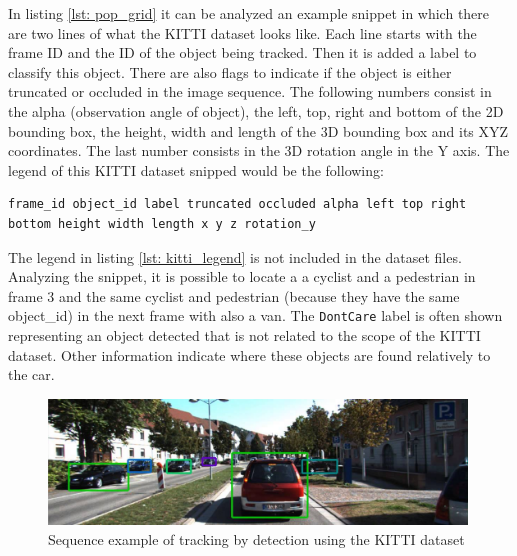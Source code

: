 In listing \ref{lst: pop_grid} it can be analyzed an example snippet in which there are two lines of what the KITTI dataset looks like. Each line starts with the frame ID and the ID of the object being tracked. Then it is added a label to classify this object. There are also flags to indicate if the object is either truncated or occluded in the image sequence. The following numbers consist in the alpha (observation angle of object), the left, top, right and bottom of the 2D bounding box, the height, width and length of the 3D bounding box and its XYZ coordinates. The last number consists in the 3D rotation angle in the Y axis. \cite{Team} The legend of this KITTI dataset snipped would be the following:

\begin{center}
	\begin{lstlisting}[caption={KITTI dataset file snippet legend.}, label={lst: kitti_legend}]
	frame_id object_id label truncated occluded alpha left top right bottom height width length x y z rotation_y	\end{lstlisting}
\end{center}

The legend in listing \ref{lst: kitti_legend} is not included in the dataset files. Analyzing the snippet, it is possible to locate a a cyclist and a pedestrian in frame 3 and the same cyclist and pedestrian (because they have the same object\_id) in the next frame with also a van. The \texttt{DontCare} label is often shown representing an object detected that is not related to the scope of the KITTI dataset. Other information indicate where these objects are found relatively to the car.

\begin{figure}[htp]
	
	\centering
	\includegraphics[width=0.99\textwidth]{capstate/imgs/kittiresult}
	
	\caption{Sequence example of tracking by detection using the KITTI dataset}
	\label{fig:kittiresult}
	
\end{figure}
	
